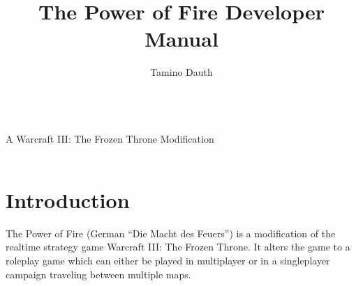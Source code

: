 \documentclass[a4paper,12pt,titlepage]{report}
\title{The Power of Fire Developer Manual}
\author{Tamino Dauth}
\begin{document}
%

\makeatletter
\begin{titlepage}
\begin{center}
        {\Huge \@title}\\[2cm]
		 A Warcraft III: The Frozen Throne Modification\\
         \@author
        \\[0.5cm]
        \@date
\end{center}
\vfill

\end{titlepage}
\makeatother



\newpage



\tableofcontents

\thispagestyle{empty}



\newpage


\chapter{Introduction}

The Power of Fire (German \enquote{Die Macht des Feuers}) is a modification of the realtime strategy game Warcraft III: The Frozen Throne. It alters the game to a roleplay game which can either be played in multiplayer or in a singleplayer campaign traveling between multiple maps.
\end{document}
